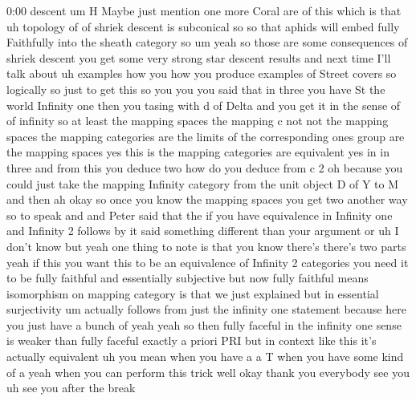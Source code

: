 \begin{unfinished}{0:00}
descent  um  H  Maybe  just  mention  one  more
Coral  are  of  this  which  is  that  uh
topology
of  of  shriek
descent  is  subconical
so  so  that  aphids  will  embed  fully
Faithfully  into  the  sheath  category
so  um  yeah  so  those  are  some
consequences  of  shriek  descent  you  get
some  very  strong  star  descent  results
and  next  time  I'll  talk  about
uh  examples  how  you  how  you  produce
examples  of  Street
covers  so  logically  so  just  to  get  this
so  you  you  you  said  that  in
three  you
have  St  the  world  Infinity  one  then  you
tasing  with  d  of  Delta  and  you  get  it  in
the  sense  of  of  infinity  so  at  least  the
mapping
spaces  the  mapping  c  not  not  the  mapping
spaces  the  mapping
categories  are  the  limits  of  the
corresponding  ones  group  are  the  mapping
spaces  yes  this  is  the  mapping
categories  are  equivalent  yes  in  in
three  and  from  this  you  deduce
two  how  do  you  deduce  from  c  2  oh
because  you  could  just  take  the  mapping
Infinity  category  from  the  unit  object  D
of  Y  to  M  and
then  ah  okay  so  once  you  know  the
mapping  spaces  you  get  two  another  way
so  to  speak
and  and  Peter  said  that  the  if  you  have
equivalence  in  Infinity  one  and  Infinity
2  follows  by  it  said  something  different
than  your  argument  or  uh  I  don't  know
but  yeah  one  thing  to  note  is  that  you
know  there's  there's  two  parts  yeah  if
this  you  want  this  to  be  an  equivalence
of  Infinity  2  categories  you  need  it  to
be  fully  faithful  and  essentially
subjective  but  now  fully  faithful  means
isomorphism  on  mapping  category  is  that
we  just  explained  but  in  essential
surjectivity
um  actually  follows  from  just  the
infinity  one  statement  because  here  you
just  have  a  bunch  of  yeah  yeah  so  then
fully
faceful  in  the  infinity  one  sense  is
weaker  than  fully  faceful  exactly  a
priori  PRI  but  in  context  like  this  it's
actually
equivalent  uh  you  mean  when  you  have
a  a
T  when  you  have  some  kind  of
a  yeah  when  you  can  perform  this
trick  well  okay  thank  you  everybody  see
you  uh  see  you  after  the
break
\end{unfinished}